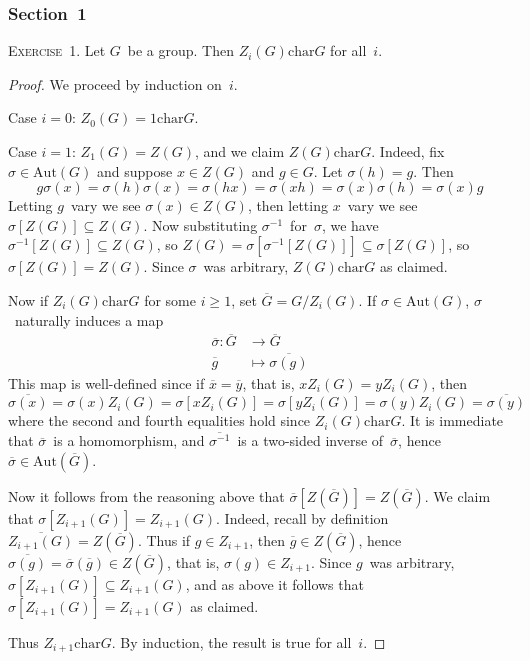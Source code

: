 \documentclass[letterpaper]{article}
\newcommand{\exercise}[1]{\goodbreak\noindent\textsc{Exercise~{#1}.}}
\newcommand{\aut}{\mathrm{Aut}}
\newcommand{\chr}{\mathrel{\mathrm{char}}}
\newcommand{\res}[1]{\overline{#1}}
\begin{document}
\subsubsection*{Section~1}
\exercise{1}
Let $G$~be a group. Then $Z_i(G)\chr G$ for all~$i$.
\begin{proof}
We proceed by induction on~$i$.

Case $i=0$: $Z_0(G)=1\chr G$.

Case $i=1$: $Z_1(G)=Z(G)$, and we claim $Z(G)\chr G$. Indeed, fix $\sigma\in\aut(G)$ and suppose $x\in Z(G)$ and $g\in G$. Let $\sigma(h)=g$. Then
$$g\sigma(x)=\sigma(h)\sigma(x)=\sigma(hx)=\sigma(xh)=\sigma(x)\sigma(h)=\sigma(x)g$$
Letting $g$~vary we see $\sigma(x)\in Z(G)$, then letting $x$~vary we see $\sigma[Z(G)]\subseteq Z(G)$. Now substituting $\sigma^{-1}$~for~$\sigma$, we have $\sigma^{-1}[Z(G)]\subseteq Z(G)$, so $Z(G)=\sigma[\sigma^{-1}[Z(G)]]\subseteq\sigma[Z(G)]$, so $\sigma[Z(G)]=Z(G)$. Since $\sigma$~was arbitrary, $Z(G)\chr G$ as claimed.

Now if $Z_i(G)\chr G$ for some $i\ge1$, set $\res{G}=G/Z_i(G)$. If $\sigma\in\aut(G)$, $\sigma$~naturally induces a map
\begin{align*}
\res{\sigma}:\res{G}&\to\res{G}\\
	\res{g}&\mapsto\res{\sigma(g)}
\end{align*}
This map is well-defined since if $\res{x}=\res{y}$, that is, $xZ_i(G)=yZ_i(G)$, then
$$\res{\sigma(x)}=\sigma(x)Z_i(G)=\sigma[xZ_i(G)]=\sigma[yZ_i(G)]=\sigma(y)Z_i(G)=\res{\sigma(y)}$$
where the second and fourth equalities hold since $Z_i(G)\chr G$. It is immediate that $\res{\sigma}$~is a homomorphism, and $\res{\sigma^{-1}}$~is a two-sided inverse of~$\res{\sigma}$, hence $\res{\sigma}\in\aut(\res{G})$.

Now it follows from the reasoning above that $\res{\sigma}[Z(\res{G})]=Z(\res{G})$. We claim that $\sigma[Z_{i+1}(G)]=Z_{i+1}(G)$. Indeed, recall by definition $\res{Z_{i+1}(G)}=Z(\res{G})$. Thus if $g\in Z_{i+1}$, then $\res{g}\in Z(\res{G})$, hence $\res{\sigma(g)}=\res{\sigma}(\res{g})\in Z(\res{G})$, that is, $\sigma(g)\in Z_{i+1}$. Since $g$~was arbitrary, $\sigma[Z_{i+1}(G)]\subseteq Z_{i+1}(G)$, and as above it follows that $\sigma[Z_{i+1}(G)]=Z_{i+1}(G)$ as claimed.

Thus $Z_{i+1}\chr G$. By induction, the result is true for all~$i$.
\end{proof}
\end{document}
